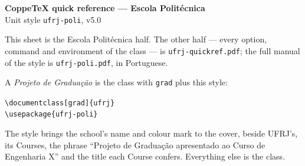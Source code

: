 \documentclass[a4paper,10pt]{article}
\newcommand\ufrjversion{v5.0}
\begin{document}
\begin{center}
  {\Large\bfseries CoppeTeX quick reference --- Escola Politécnica}\\[2pt]
  {\normalsize Unit style \texttt{ufrj-poli}, \ufrjversion}\\[6pt]
  \begin{minipage}{0.92\textwidth}\small
  This sheet is the Escola Politécnica half. The other half --- every option,
  command and environment of the class --- is \texttt{ufrj-quickref.pdf}; the
  full manual of the style is \texttt{ufrj-poli.pdf}, in Portuguese.

  \medskip
  A \emph{Projeto de Graduação} is the class with \texttt{grad} plus this
  style:

  \medskip
  \verb|\documentclass[grad]{ufrj}|\\
  \verb|\usepackage{ufrj-poli}|

  \medskip
  The style brings the school's name and colour mark to the cover, beside
  UFRJ's, its Courses, the phrase ``Projeto de Graduação apresentado ao Curso
  de Engenharia X'' and the title each Course confers. Everything else is the
  class.
  \end{minipage}
\end{center}

\vspace{6pt}
\end{document}
